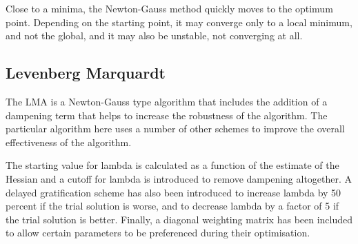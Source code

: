 Close to a minima, the Newton-Gauss method quickly moves to the optimum point.  Depending on the starting point, it may converge only to a local minimum, and not the global, and it may also be unstable, not converging at all.




\subsection{Levenberg Marquardt}

The LMA is a Newton-Gauss type algorithm that includes the addition of a dampening term that helps to increase the robustness of the algorithm.  The particular algorithm here uses a number of other schemes to improve the overall effectiveness of the algorithm.  

The starting value for lambda is calculated as a function of the estimate of the Hessian and a cutoff for lambda is introduced to remove dampening altogether.  A delayed gratification scheme has also been introduced to increase lambda by 50 percent if the trial solution is worse, and to decrease lambda by a factor of 5 if the trial solution is better. Finally, a diagonal weighting matrix has been included to allow certain parameters to be preferenced during their optimisation.

\eqLevenbergMarquardt


